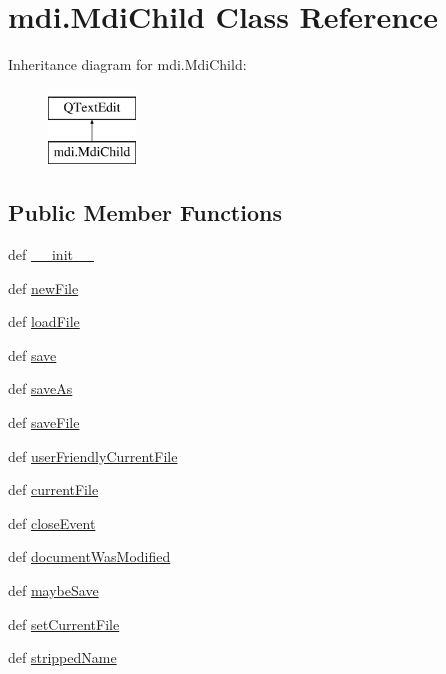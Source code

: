 \hypertarget{classmdi_1_1MdiChild}{}\section{mdi.\+Mdi\+Child Class Reference}
\label{classmdi_1_1MdiChild}
Inheritance diagram for mdi.\+Mdi\+Child\+:\begin{figure}[H]
\begin{center}
\leavevmode
\includegraphics[height=2.000000cm]{classmdi_1_1MdiChild}
\end{center}
\end{figure}
\subsection*{Public Member Functions}
\begin{DoxyCompactItemize}
\item 
def \hyperlink{classmdi_1_1MdiChild_a03b7bccd2734fdcac718ad87205f0551}{\+\_\+\+\_\+init\+\_\+\+\_\+}
\item 
def \hyperlink{classmdi_1_1MdiChild_adaba2445a8583a2e5867f0cc82d87cc6}{new\+File}
\item 
def \hyperlink{classmdi_1_1MdiChild_a8a1bc2ecc2f84529225cefbb1a189ba5}{load\+File}
\item 
def \hyperlink{classmdi_1_1MdiChild_a65fbb039c580c3a82a35e202a85a4051}{save}
\item 
def \hyperlink{classmdi_1_1MdiChild_affc9fb681f23b3bb36141353cf75be9d}{save\+As}
\item 
def \hyperlink{classmdi_1_1MdiChild_afa13a0cec2a002da0fd27869b4f3c5bb}{save\+File}
\item 
def \hyperlink{classmdi_1_1MdiChild_a2e1c4392a385737ef634467bd6ecbe1b}{user\+Friendly\+Current\+File}
\item 
def \hyperlink{classmdi_1_1MdiChild_a57bd6e9f2c526be5703974b4e63636ca}{current\+File}
\item 
def \hyperlink{classmdi_1_1MdiChild_a3a7ff3583ec77d09ce9e02104382cee9}{close\+Event}
\item 
def \hyperlink{classmdi_1_1MdiChild_a9b6a10bdfd295ad8c119c2730c9bdc66}{document\+Was\+Modified}
\item 
def \hyperlink{classmdi_1_1MdiChild_a76ad8fb89c694795b18a0ca910173e3a}{maybe\+Save}
\item 
def \hyperlink{classmdi_1_1MdiChild_ad9c133b8df1a136955bc70e7d96e1fa4}{set\+Current\+File}
\item 
def \hyperlink{classmdi_1_1MdiChild_aaa7467da8089b68d627278e01b877761}{stripped\+Name}
\end{DoxyCompactItemize}
